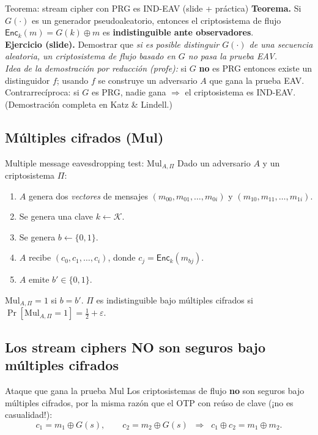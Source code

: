 \documentclass[11pt,a4paper]{article}
\newcommand{\Kset}{\mathcal{K}}
\newcommand{\xor}{\oplus}
\newcommand{\Enc}{\mathsf{Enc}}
\newcommand{\bits}{\{0,1\}}
\begin{document}
\begin{practbox}{Teorema: stream cipher con PRG es IND-EAV (slide + práctica)}
\textbf{Teorema.} Si $G(\cdot)$ es un generador pseudoaleatorio, entonces el criptosistema
de flujo $\Enc_k(m)=G(k)\xor m$ es \textbf{indistinguible ante observadores}.\\[4pt]
\textbf{Ejercicio (slide).} Demostrar que \emph{si es posible distinguir $G(\cdot)$ de una
secuencia aleatoria, un criptosistema de flujo basado en $G$ no pasa la prueba EAV.}\\[3pt]
\emph{Idea de la demostración por reducción (profe):} si $G$ \textbf{no} es PRG entonces
existe un distinguidor $f$; usando $f$ se construye un adversario $A$ que gana la prueba
EAV. Contrarrecíproca: si $G$ es PRG, nadie gana $\Rightarrow$ el criptosistema es
IND-EAV. (Demostración completa en Katz \& Lindell.)
\end{practbox}

\subsection{Múltiples cifrados (Mul)}

\begin{defbox}{Multiple message eavesdropping test: $\mathrm{Mul}_{A,\Pi}$}
Dado un adversario $A$ y un criptosistema $\Pi$:
\begin{enumerate}[leftmargin=1.6em,itemsep=2pt]
  \item $A$ genera dos \emph{vectores} de mensajes
        $(m_{00},m_{01},\dots,m_{0i})$ y $(m_{10},m_{11},\dots,m_{1i})$.
  \item Se genera una clave $k\leftarrow\Kset$.
  \item Se genera $b\leftarrow\bits$.
  \item $A$ recibe $(c_0,c_1,\dots,c_i)$, donde $c_j=\Enc_k(m_{bj})$.
  \item $A$ emite $b'\in\bits$.
\end{enumerate}
$\mathrm{Mul}_{A,\Pi}=1$ si $b=b'$. $\Pi$ es indistinguible bajo múltiples cifrados si
$\Pr[\mathrm{Mul}_{A,\Pi}=1]=\tfrac12+\varepsilon$.
\end{defbox}

\subsection{Los stream ciphers NO son seguros bajo múltiples cifrados}

\begin{warnbox}{Ataque que gana la prueba Mul}
Los criptosistemas de flujo \textbf{no} son seguros bajo múltiples cifrados, por la misma
razón que el OTP con reúso de clave (¡no es casualidad!):
\[
  c_1 = m_1\xor G(s),\qquad c_2 = m_2\xor G(s)
  \;\;\Longrightarrow\;\; c_1\xor c_2 = m_1\xor m_2.
\]
\end{warnbox}
\end{document}
